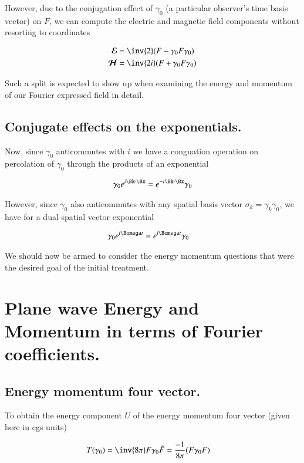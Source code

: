 \documentclass{article}
\newcommand{\EE}[0]{\boldsymbol{\mathcal{E}}}
\newcommand{\HH}[0]{\boldsymbol{\mathcal{H}}}
\begin{document}
However, due to the conjugation effect of $\gamma_0$
(a particular observer's time basis vector)
on $F$,
we can compute the electric and magnetic field components without resorting to coordinates

\begin{align}
\EE &= \inv{2}(F - \gamma_0 F \gamma_0 ) \\
\HH &= \inv{2i}(F + \gamma_0 F \gamma_0 )
\end{align}

Such a split is expected to show up when examining the energy and momentum of our Fourier expressed field in detail.

\subsection{ Conjugate effects on the exponentials. }

Now, since $\gamma_0$ anticommutes with $i$ we have a conguation operation on percolation of $\gamma_0$ through the products of an exponential

\begin{align}
\gamma_0 e^{i \Bk \cdot \Bx} = e^{-i \Bk \cdot \Bx} \gamma_0
\end{align}

However, since $\gamma_0$ also anticommutes with any spatial basis vector $\sigma_k = \gamma_k \gamma_0$, we have for a dual spatial vector exponential

\begin{align}
\gamma_0 e^{i \Bomega t} &= e^{i \Bomega t} \gamma_0
\end{align}

We should now be armed to consider the energy momentum questions that were the desired goal of the initial treatment.

\section{ Plane wave Energy and Momentum in terms of Fourier coefficients. }

\subsection{ Energy momentum four vector. }

To obtain the energy component $U$ of the energy momentum four
vector (given here in cgs units)

\begin{align}
T(\gamma_0) &= \inv{8\pi} F \gamma_0 \tilde{F} = \frac{-1}{8\pi}(F \gamma_0 F)
\end{align}
\end{document}
